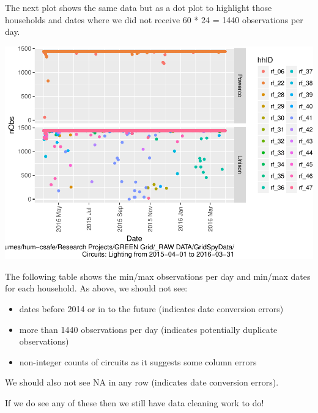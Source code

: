 \documentclass[]{article}
\providecommand{\tightlist}{%
  \setlength{\itemsep}{0pt}\setlength{\parskip}{0pt}}
\begin{document}
The next plot shows the same data but as a dot plot to highlight those
households and dates where we did not receive 60 * 24 = 1440
observations per day.

\includegraphics{nzGGHouseholdPowerDemandProfile_Lighting_2015-04-01_2016-03-31_files/figure-latex/loadedFilesObs point plot-1.pdf}

The following table shows the min/max observations per day and min/max
dates for each household. As above, we should not see:

\begin{itemize}
\tightlist
\item
  dates before 2014 or in to the future (indicates date conversion
  errors)
\item
  more than 1440 observations per day (indicates potentially duplicate
  observations)
\item
  non-integer counts of circuits as it suggests some column errors
\end{itemize}

We should also not see NA in any row (indicates date conversion errors).

If we do see any of these then we still have data cleaning work to do!
\end{document}
